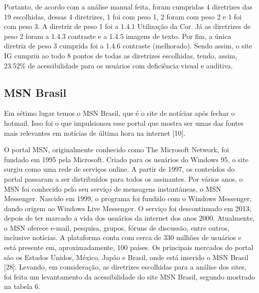 \documentclass[a4paper]{article}
\begin{document}
\begin{titlepage}
Portanto, de acordo com a análise manual feita, foram cumpridas 4 diretrizes das 19 escolhidas, dessas 4 diretrizes, 1 foi com peso 1, 2 foram com peso 2 e 1 foi com peso 3. A diretriz de peso 1 foi a 1.4.1 Utilização da Cor. Já as diretrizes de peso 2 foram a 1.4.3 contraste e a 1.4.5 imagens de texto. Por fim, a única diretriz de peso 3 cumprida foi a 1.4.6 contraste (melhorado). Sendo assim, o site IG cumpriu ao todo 8 pontos de todas as diretrizes escolhidas, tendo, assim, 23.52\% de acessibilidade para os usuários com deficiência visual e auditiva.

\subsection{MSN Brasil}

Em sétimo lugar temos o MSN Brasil, que é o site de notícias após fechar o hotmail. Isso foi o que impulsionou esse portal que mostra ser umas das fontes mais relevantes em notícias de última hora na internet [10].

O portal MSN, originalmente conhecido como The Microsoft Network, foi fundado em 1995 pela Microsoft. Criado para os usuários do Windows 95, o site surgiu como uma rede de serviços online. A partir de 1997, os conteúdos do portal passaram a ser distribuídos para todos os assinantes. Por vários anos, o MSN foi conhecido pelo seu serviço de mensagens instantâneas, o MSN Messenger. Nascido em 1999, o programa foi fundido com o Windows Messenger, dando origem ao Windows Live Messenger. O serviço foi descontinuado em 2013, depois de ter marcado a vida dos usuários da internet dos anos 2000. Atualmente, o MSN oferece e-mail, pesquisa, grupos, fóruns de discussão, entre outros, inclusive notícias. A plataforma conta com cerca de 330 milhões de usuários e está presente em, aproximadamente, 100 países. Os principais mercados do portal são os Estados Unidos, México, Japão e  Brasil, onde está inserido o MSN Brasil [28].  Levando, em consideração, as diretrizes escolhidas para a análise dos sites, foi feita um levantamento da acessibilidade do site MSN Brasil, segundo mostrado na tabela 6.\\


\end{titlepage}
\end{document}
